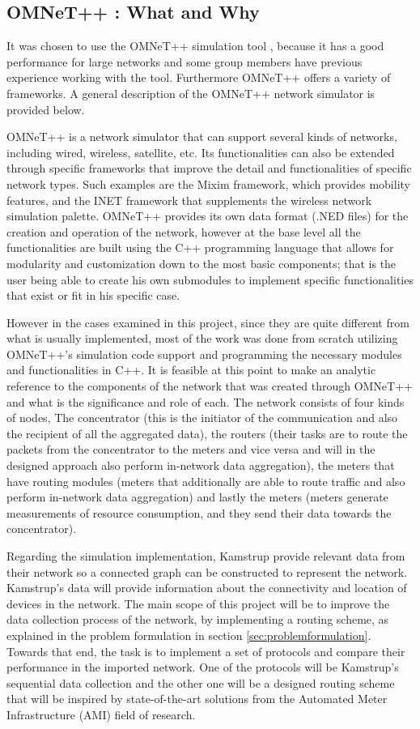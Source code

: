 \subsection{OMNeT++ : What and Why}
It was chosen to use the OMNeT++ simulation tool \citep{omnet}, because it has a good performance for large networks and some group members have previous experience working with the tool. Furthermore OMNeT++ offers a variety of frameworks. A general description of the OMNeT++ network simulator is provided below.

OMNeT++ is a network simulator that can support several kinds of networks, including wired, wireless, satellite, etc. Its functionalities can also be extended through specific frameworks that improve the detail and functionalities of specific network types. Such examples are the Mixim framework, which provides mobility features, and the INET framework that supplements the wireless network simulation palette. OMNeT++ provides its own data format (.NED files) for the creation and operation of the network, however at the base level all the functionalities are built using the C++ programming language that allows for modularity and customization down to the most basic components; that is the user being able to create his own submodules to implement specific functionalities that exist or fit in his specific case.

However in the cases examined in this project, since they are quite different from what is usually implemented, most of the work was done from scratch utilizing OMNeT++'s simulation code support and programming the necessary modules and functionalities in C++. It is feasible at this point to make an analytic reference to the components of the network that was created through OMNeT++ and what is the significance and role of each. The network consists of four kinds of nodes, The concentrator (this is the initiator of the communication and also the recipient of all the aggregated data), the routers (their tasks are to route the packets from the concentrator to the meters and vice versa and will in the designed approach also perform in-network data aggregation), the meters that have routing modules (meters that additionally are able to route traffic and also perform in-network data aggregation) and lastly the meters (meters generate measurements of resource consumption, and they send their data towards the concentrator).

Regarding the simulation implementation, Kamstrup provide relevant data from their network so a connected graph can be constructed to represent the network. Kamstrup's data will provide information about the connectivity and location of devices in the network.
The main scope of this project will be to improve the data collection process of the network, by implementing a routing scheme, as explained in the problem formulation in section \ref{sec:problemformulation}. Towards that end, the task is to implement a set of protocols and compare their performance in the imported network. One of the protocols will be Kamstrup's sequential data collection and the other one will be a designed routing scheme that will be inspired by state-of-the-art solutions from the Automated Meter Infrastructure (AMI) field of research.

